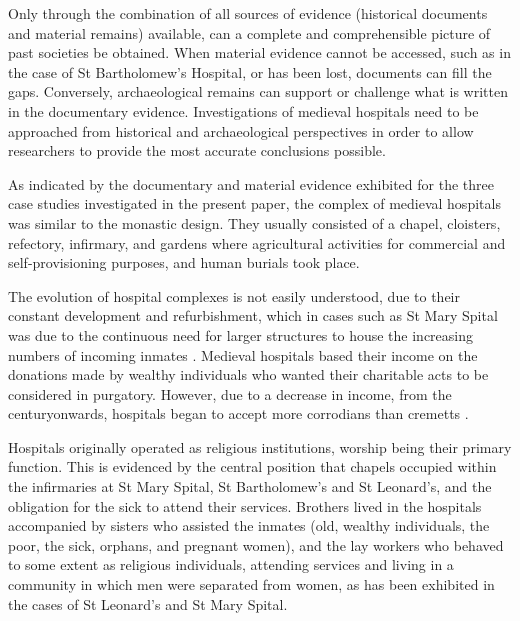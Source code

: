 \IJSRAseparator
{}
Only through the combination of all sources of evidence (historical documents and material remains) available, can a complete and comprehensible picture of past societies be obtained. When material evidence cannot be accessed, such as in the case of St Bartholomew’s Hospital, or has been lost, documents can fill the gaps. Conversely, archaeological remains can support or challenge what is written in the documentary evidence. Investigations of medieval hospitals need to be approached from historical and archaeological perspectives in order to allow researchers to provide the most accurate conclusions possible. 

As indicated by the documentary and material evidence exhibited for the three case studies investigated in the present paper, the complex of medieval hospitals was similar to the monastic design. They usually consisted of a chapel, cloisters, refectory, infirmary, and gardens where agricultural activities for commercial and self-provisioning purposes, and human burials took place. 

The evolution of hospital complexes is not easily understood, due to their constant development and refurbishment, which in cases such as St Mary Spital was due to the continuous need for larger structures to house the increasing numbers of incoming inmates \parencites[69,117-118]{Henderson_2006}[27]{Malcom_2014}[41,43]{Orme_1995}[35]{Rawcliffe_1999}.
Medieval hospitals based their income on the donations made by wealthy individuals who wanted their charitable acts to be considered in purgatory. However, due to a decrease in income, from the  century\AD onwards, hospitals began to accept more corrodians than cremetts \parencites[69]{Dean_2008}[207]{Malcom_2014}. 

Hospitals originally operated as religious institutions, worship being their primary function. This is evidenced by the central position that chapels occupied within the infirmaries at St Mary Spital, St Bartholomew’s and St Leonard’s, and the obligation for the sick to attend their services. Brothers lived in the hospitals accompanied by sisters who assisted the inmates (old, wealthy individuals, the poor, the sick, orphans, and pregnant women), and the lay workers who behaved to some extent as religious individuals, attending services and living in a community in which men were separated from women, as has been exhibited in the cases of St Leonard’s and St Mary Spital. 

